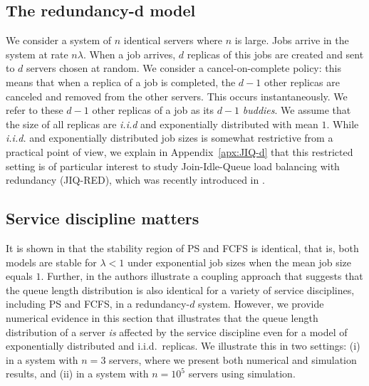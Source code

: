 \documentclass[acmsmall,nonacm]{acmart}
\newcommand\red[1]{{#1}}
\begin{document}
\subsection{The redundancy-d model}

We consider a system of $n$ identical servers where $n$ is large. Jobs arrive in the system at rate $n\lambda$. When a job arrives, $d$ replicas  of this jobs are created and sent to $d$ servers chosen at random. We consider a cancel-on-complete policy: this means that when a replica of a job is completed, the $d-1$ other replicas are canceled and removed from the other servers. This occurs instantaneously.  We refer to these $d-1$ other replicas of a job as its $d-1$ {\it buddies}.  We assume that the size of all replicas are \emph{i.i.d} and exponentially distributed with mean $1$.  While \emph{i.i.d.}
and exponentially distributed job sizes is somewhat restrictive from a practical
point of view, we explain in Appendix~\ref{apx:JIQ-d} that this restricted setting
is of particular interest to study Join-Idle-Queue load balancing with redundancy (JIQ-RED), which was recently introduced in \cite{Harte}. 


\subsection{Service discipline matters}
\label{ssec:PSneFCFS}

It is shown in \cite{anton2021stability} that the stability region of PS and FCFS is identical, that is, both models are stable for $\lambda < 1$ under exponential job sizes when the mean job size equals $1$. 
\red{Further, in \cite{antonMAMA2023} the authors illustrate a coupling approach  that suggests that the queue length distribution is also identical for a variety of service disciplines, including PS and FCFS, in a redundancy-$d$ system.} However, we provide numerical evidence in this section
that illustrates that the queue length distribution of a server \emph{is} affected by the service
discipline even for a model of exponentially distributed and i.i.d.~replicas.
We illustrate this in two settings: (i) in a system with $n=3$ servers, where we present
both numerical and simulation results, and (ii) in a system with $n=10^5$ servers using simulation.
\end{document}
